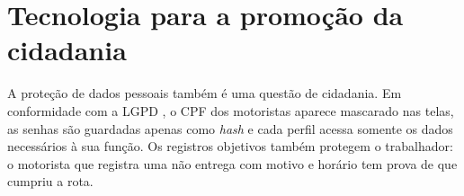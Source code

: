 \section{Tecnologia para a promoção da cidadania}

A proteção de dados pessoais também é uma questão de cidadania. Em conformidade com a LGPD \cite{brasil2018lgpd}, o CPF dos motoristas aparece mascarado nas telas, as senhas são guardadas apenas como \textit{hash} e cada perfil acessa somente os dados necessários à sua função. Os registros objetivos também protegem o trabalhador: o motorista que registra uma não entrega com motivo e horário tem prova de que cumpriu a rota.
